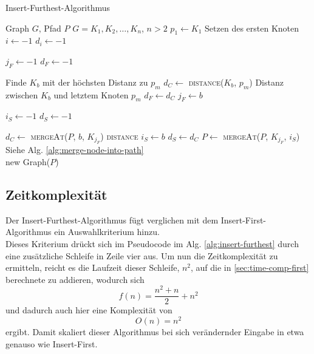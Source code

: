 \begin{algorithm}[H]
    \caption{Insert-Furthest-Algorithmus}
    \label{alg:insert-furthest}
    \begin{algorithmic}[1]
        \Require Graph $G$, Pfad $P$ 
        \Require $G= K_1,K_2,\ldots,K_n$, $n > 2$ 
        \State $p_1 \gets K_1$
        \Comment Setzen des ersten Knoten
        \State $i \gets -1$
        \State $d_i \gets -1$

            \State $j_F \gets -1$
            \State $d_F \gets -1$

                \Comment Finde $K_b$ mit der höchsten Distanz zu $p_m$
                \State $d_C \gets$ \textsc{distance}($K_b$, $p_m$)
                \Comment Distanz zwischen $K_b$ und letztem Knoten $p_m$
                    \State $d_F \gets d_C$
                    \State $j_F \gets b$
                \EndIf
            \EndFor

            \State $i_S \gets -1$
            \State $d_S \gets -1$

                \State $d_C \gets$ \textsc{mergeAt}($P$, $b$, $K_{j_F}$) \textsc{distance}
                    \State $i_S \gets b$
                    \State $d_S \gets d_C$
                \EndIf
            \EndFor
            \State $P \gets$ \textsc{mergeAt}($P$, $K_{j_F}$, $i_S$)
            \Comment Siehe Alg. \vref{alg:merge-node-into-path}
        \EndFor \\
        \Return new Graph($P$)
    \end{algorithmic}
\end{algorithm}

\subsection{Zeitkomplexität}
Der Insert-Furthest-Algorithmus fügt verglichen mit dem Insert-First-Algorithmus ein Auswahlkriterium hinzu.\\
Dieses Kriterium drückt sich im Pseudocode im \ac{Alg.} \vref{alg:insert-furthest} durch eine zusätzliche Schleife in Zeile vier aus.
Um nun die Zeitkomplexität zu ermitteln, reicht es die Laufzeit dieser Schleife, $n^2$, auf die in \vref{sec:time-comp-first} berechnete zu addieren, wodurch sich 
$$f(n) = \frac{n^2+n}{2}+n^2$$
und dadurch auch hier eine Komplexität von
$$O(n) = n^2$$
ergibt.
Damit skaliert dieser Algorithmus bei sich verändernder Eingabe in etwa genauso wie Insert-First.

